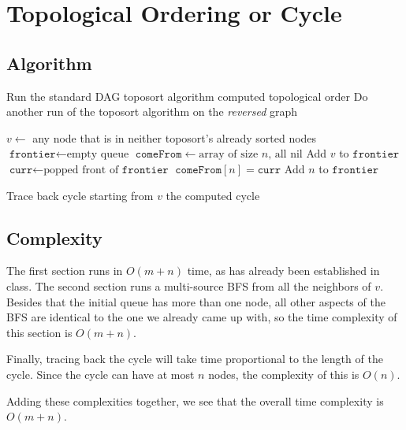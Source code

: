 \documentclass[12pt]{article}
\begin{document}
\section{Topological Ordering or Cycle}

\subsection{Algorithm}

\begin{algorithmic}[1]
    \State Run the standard DAG toposort algorithm
        \State \Return computed topological order
    \EndIf
    \State Do another run of the toposort algorithm on the \textit{reversed} graph

    \item[]
    \State $v \gets$ any node that is in neither toposort's already sorted nodes
    \State $\texttt{frontier} \gets \text{empty queue}$
    \State $\texttt{comeFrom} \gets \text{array of size }n\text{, all nil}$
    \State Add $v$ to $\texttt{frontier}$
        \State $\texttt{curr} \gets \text{popped front of }\texttt{frontier}$
                \State $\texttt{comeFrom}[n] = \texttt{curr}$
                \State Add $n$ to $\texttt{frontier}$
            \EndIf
        \EndFor
    \EndWhile

    \item[]
    \State Trace back cycle starting from $v$
    \State \Return the computed cycle
\end{algorithmic}

\subsection{Complexity}

The first section runs in $O(m+n)$ time, as has already been established in class.
The second section runs a multi-source BFS from all the neighbors of $v$.
Besides that the initial queue has more than one node, all other aspects
of the BFS are identical to the one we already came up with,
so the time complexity of this section is $O(m+n)$.

Finally, tracing back the cycle will take time proportional to the length of the cycle.
Since the cycle can have at most $n$ nodes, the complexity of this is $O(n)$.

Adding these complexities together,
we see that the overall time complexity is $O(m+n)$.
\end{document}
